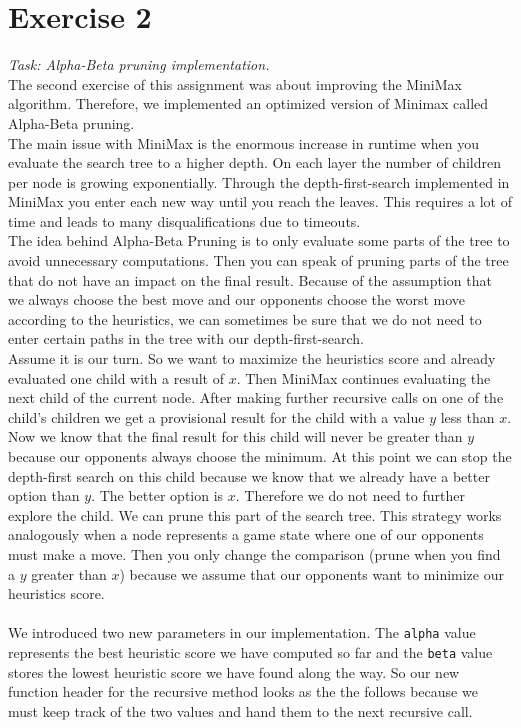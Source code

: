 \section*{Exercise 2}
\textit{Task: Alpha-Beta pruning implementation.} \\

\noindent The second exercise of this assignment was about improving the MiniMax algorithm. Therefore, we implemented an optimized version of Minimax called Alpha-Beta pruning. \\
The main issue with MiniMax is the enormous increase in runtime when you evaluate the search tree to a higher depth. On each layer the number of children per node is growing exponentially. Through the depth-first-search implemented in MiniMax you enter each new way until you reach the leaves. This requires a lot of time and leads to many disqualifications due to timeouts.\\
The idea behind Alpha-Beta Pruning is to only evaluate some parts of the tree to avoid unnecessary computations. Then you can speak of pruning parts of the tree that do not have an impact on the final result. Because of the assumption that we always choose the best move and our opponents choose the worst move according to the heuristics, we can sometimes be sure that we do not need to enter certain paths in the tree with our depth-first-search. \\
Assume it is our turn. So we want to maximize the heuristics score and already evaluated one child with a result of $x$. Then MiniMax continues evaluating the next child of the current node. After making further recursive calls on one of the child's children we get a provisional result for the child with a value $y$ less than $x$. Now we know that the final result for this child will never be greater than $y$ because our opponents always choose the minimum. At this point we can stop the depth-first search on this child because we know that we already have a better option than $y$. The better option is $x$. Therefore we do not need to further explore the child. We can prune this part of the search tree. This strategy works analogously when a node represents a game state where one of our opponents must make a move. Then you only change the comparison (prune when you find a $y$ greater than $x$) because we assume that our opponents want to minimize our heuristics score.\\
\\
We introduced two new parameters in our implementation. The \texttt{alpha} value represents the best heuristic score we have computed so far and the \texttt{beta} value stores the lowest heuristic score we have found along the way. So our new function header for the recursive method looks as the the follows because we must keep track of the two values and hand them to the next recursive call.

